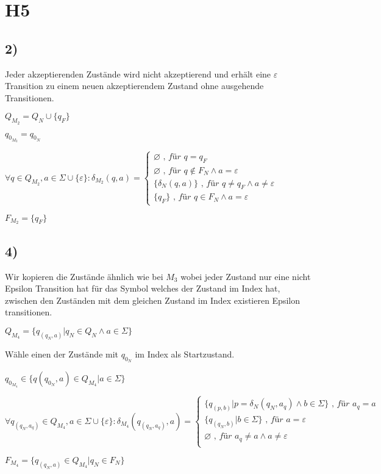 \section*{H5}

\subsection*{2)}

Jeder akzeptierenden Zustände wird nicht akzeptierend und erhält eine $\varepsilon$ 
Transition zu einem neuen akzeptierendem Zustand ohne ausgehende Transitionen.

$Q_{M_2} = Q_N \cup \{q_F\}$

$q_{0_{M_2}} = q_{0_N}$

$\forall q \in Q_{M_2}, a \in \Sigma \cup \{\varepsilon\}:
\delta_{M_2}(q,a) =
\begin{cases}
\varnothing \textit{ , für }q = q_F \\
\varnothing \textit{ , für }q \notin F_N \wedge a = \varepsilon \\
\{\delta_N(q,a)\} \textit{ , für } q \neq q_F \wedge a \neq \varepsilon \\
\{q_F\} \textit{ , für } q \in F_N \wedge a = \varepsilon
\end{cases}$

$F_{M_2} = \{q_F\}$

\subsection*{4)}

Wir kopieren die Zustände ähnlich wie bei $M_3$ wobei jeder Zustand nur eine nicht Epsilon Transition hat für das Symbol welches der Zustand im Index hat, zwischen den Zuständen mit dem gleichen Zustand im Index existieren Epsilon transitionen.

$Q_{M_4} = \{q_{(q_N,a)}|q_N \in Q_N \wedge a \in \Sigma \}$

Wähle einen der Zustände mit $q_{0_N}$ im Index als Startzustand.

$q_{0_{M_4}} \in \{q(q_{0_N},a) \in Q_{M_4}| a \in \Sigma \}$

$\forall q_{(q_N,a_q)} \in Q_{M_4}, a \in \Sigma \cup \{\varepsilon\}: 
\delta_{M_4}(q_{(q_{N},a_{q})},a) =
\begin{cases}
\{q_{(p,b)}|p = \delta_{N}(q_{N},a_{q}) \wedge b \in \Sigma\} \textit{ , für } a_q = a \\
\{q_{(q_{N},b)}|b \in \Sigma\} \textit{ , für }  a = \varepsilon \\
\varnothing \textit{ , für } a_q \neq a \wedge a \neq \varepsilon \\


\end{cases}$


$F_{M_4} = \{q_{(q_N,a)} \in Q_{M_4} | q_N \in F_N\}$